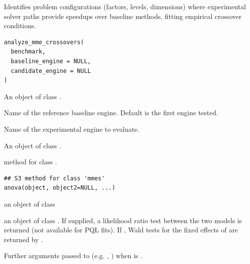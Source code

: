\documentclass[a4paper]{book}
\begin{document}
%
\begin{Description}\relax
Identifies problem configurations (factors, levels, dimensions) where experimental solver
paths provide speedups over baseline methods, fitting empirical crossover conditions.
\end{Description}
%
\begin{Usage}
\begin{verbatim}
analyze_mme_crossovers(
  benchmark,
  baseline_engine = NULL,
  candidate_engine = NULL
)
\end{verbatim}
\end{Usage}
%
\begin{Arguments}
\begin{ldescription}
\item[\code{benchmark}] An object of class .

\item[\code{baseline\_engine}] Name of the reference baseline engine. Default is the first engine tested.

\item[\code{candidate\_engine}] Name of the experimental engine to evaluate.
\end{ldescription}
\end{Arguments}
%
\begin{Value}
An object of class .
\end{Value}
%
\begin{Description}\relax
{} method for class .
\end{Description}
%
\begin{Usage}
\begin{verbatim}
## S3 method for class 'mmes'
anova(object, object2=NULL, ...)
\end{verbatim}
\end{Usage}
%
\begin{Arguments}
\begin{ldescription}
\item[\code{object}] an object of class 
\item[\code{object2}] an object of class . If supplied, a likelihood ratio test between the two models is returned (not available for PQL fits). If , Wald tests for the fixed effects of  are returned by .
\item[\code{...}] Further arguments passed to  (e.g. , ) when  is .
\end{ldescription}
\end{Arguments}
\end{document}
